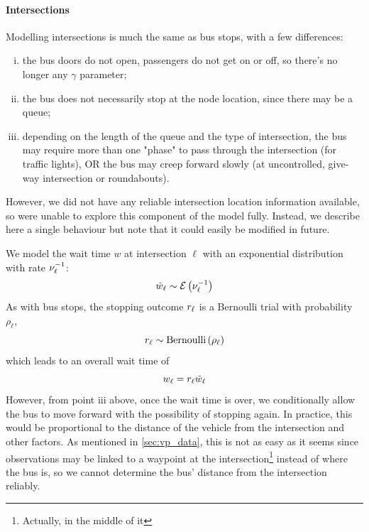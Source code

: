 \paragraph{Intersections}

Modelling intersections is much the same as bus stops, with a few differences:
\begin{enumerate}[i.]
\item the bus doors do not open, passengers do not get on or off, so there's no longer any $\gamma$ parameter;
\item the bus does not necessarily stop at the node location, since there may be a queue;
\item depending on the length of the queue and the type of intersection, the bus may require more than one "phase" to pass through the intersection (for traffic lights), OR the bus may creep forward slowly (at uncontrolled, give-way intersection or roundabouts).
\end{enumerate}

However, we did not have any reliable intersection location information available, so were unable to explore this component of the model fully. Instead, we describe here a single behaviour but note that it could easily be modified in future.

We model the wait time $w$ at intersection $\ell$ with an exponential distribution with rate $\nu_\ell^{-1}$:
\begin{equation}
\label{eq:int_wait}
\tilde w_\ell \sim \mathcal{E}\left(\nu_\ell^{-1}\right)
\end{equation}
As with bus stops, the stopping outcome $r_\ell$ is a Bernoulli trial with probability $\rho_\ell$,
\begin{equation}
\label{eq:int_stop_bern}
r_\ell \sim \mathrm{Bernoulli}\left(\rho_\ell\right)
\end{equation}
which leads to an overall wait time of
\begin{equation}
\label{eq:int_total_wait}
w_\ell = r_\ell \tilde w_\ell
\end{equation}
However, from point iii above, once the wait time is over, we conditionally allow the bus to move forward with the possibility of stopping again. In practice, this would be proportional to the distance of the vehicle from the intersection and other factors. As mentioned in \cref{sec:vp_data}, this is not as easy as it seems since observations may be linked to a waypoint at the intersection\footnote{Actually, in the middle of it} instead of where the bus is, so we cannot determine the bus' distance from the intersection reliably.
